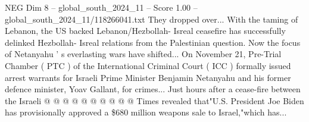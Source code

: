 \begin{textsample}{NEG Dim 8 – global\_south\_2024\_11 – Score 1.00 – global\_south\_2024\_11/118266041.txt}
They dropped over...
With the taming of Lebanon, the US backed Lebanon/Hezbollah- Isreal ceasefire has successfully delinked Hezbollah- Isreal relations from the Palestinian question.
Now the focus of Netanyahu ' s everlasting wars have shifted...
On November 21, Pre-Trial Chamber ( PTC ) of the International Criminal Court ( ICC ) formally issued arrest warrants for Israeli Prime Minister Benjamin Netanyahu and his former defence minister, Yoav Gallant, for crimes...
Just hours after a cease-fire between the Israeli @ @ @ @ @ @ @ @ @ @ Times revealed that"U.S.
President Joe Biden has provisionally approved a \$680 million weapons sale to Israel,"which has...

\end{textsample}
